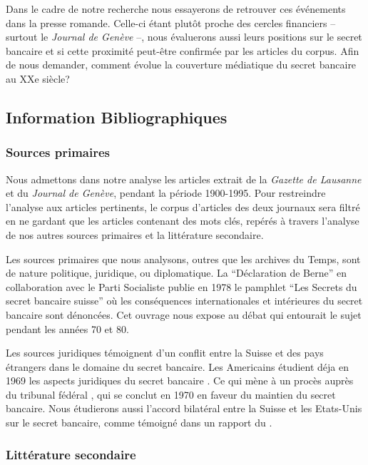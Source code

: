 \documentclass[11pt]{article}
\begin{document}
Dans le cadre de notre recherche nous essayerons de retrouver ces événements
dans la presse romande. Celle-ci étant plutôt proche des cercles financiers –
surtout le \textit{Journal de Genève} \citep{ConfClass1} –, nous évaluerons aussi
leurs positions sur le secret bancaire et si cette proximité peut-être
confirmée par les articles du corpus. Afin de nous demander, comment évolue la
couverture médiatique du secret bancaire au XXe siècle?

\subsection{Information Bibliographiques}
\subsubsection{Sources primaires}

Nous admettons dans notre analyse les articles extrait de la \textit{Gazette de
Lausanne} et du \textit{Journal de Genève}, pendant la
période 1900-1995. Pour restreindre l’analyse aux articles pertinents, le corpus
d’articles des deux journaux sera filtré en ne gardant que les articles
contenant des mots clés, repérés à travers l’analyse de nos autres sources
primaires et la littérature secondaire.

Les sources primaires que nous analysons, outres que les archives du Temps, sont
de nature politique, juridique, ou diplomatique. La “Déclaration de Berne” en
collaboration avec le Parti Socialiste publie en 1978 le pamphlet “Les Secrets
du secret bancaire suisse” \citep{GiovanniniPierLuigi1978Lsds} où les
conséquences internationales et intérieures du secret bancaire sont dénoncées.
Cet ouvrage nous expose au débat qui entourait le sujet pendant les années 70 et
80.

Les sources juridiques témoignent d'un conflit entre la Suisse et des pays
étrangers dans le domaine du secret bancaire. Les Americains étudient déja en
1969 les aspects juridiques du secret bancaire \citep{Mueller69}. Ce qui mène à
un procès auprès du tribunal fédéral \citep{tribunalFederal70}, qui se conclut
en 1970 en faveur du maintien du secret bancaire. Nous étudierons aussi l'accord
bilatéral entre la Suisse et les Etats-Unis sur le secret bancaire, comme
témoigné dans un rapport du \citet{insiderTrading83}.

\subsubsection{Littérature secondaire}
\end{document}
